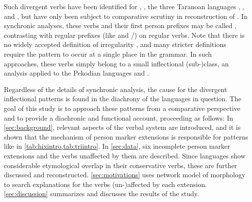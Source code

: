 Such divergent verbs have been identified for \hixka \parencite[188]{hixkaryanaderby1985}, \waiwai \parencite[90]{gildea1998}, the three Taranoan languages \parencite[112--115]{meira1998proto}, \bakairi \parencite{meira2003bakairi}, and \arara \parencite[153]{alves2017arara}, but have only been subject to comparative scrutiny in  reconstruction of \PTar.
In synchronic analyses, these verbs and their first person prefixes may be called , contrasting with regular prefixes (like \hixka {} and \trio {}/) on regular verbs.
Note that there is no widely accepted definition of irregularity \parencite{stolz2012introduction}, and many stricter definitions \parencite[e.g.,][]{haspelmath2010understanding} require the pattern to occur at a single place in the grammar.
In such approaches, these verbs simply belong to a small inflectional (sub-)class, an analysis applied to the Pekodian languages \bakairi and \arara \parencites[4]{meira2003bakairi}[149]{alves2017arara}.

Regardless of the details of synchronic analysis, the cause for the divergent inflectional patterns is found in the diachrony of the languages in question.
The goal of this study is to approach these patterns from a comparative perspective and to provide a diachronic and functional account, proceeding as follows:
In \cref{sec:background}, relevant aspects of the \PC verbal system are introduced, and it is shown that the mechanism of person marker extensions is responsible for patterns like in \cref{tab:hixintro,tab:triintro}.
In \cref{sec:data}, six incomplete person marker extensions and the verbs unaffected by them are described.
Since languages show considerable etymological overlap in their conservative verbs, these are further discussed and reconstructed.
\cref{sec:motivations} uses  network model of morphology to search explanations for the verbs (un-)affected by each extension.
\cref{sec:discussion} summarizes and discusses the results of the study.

